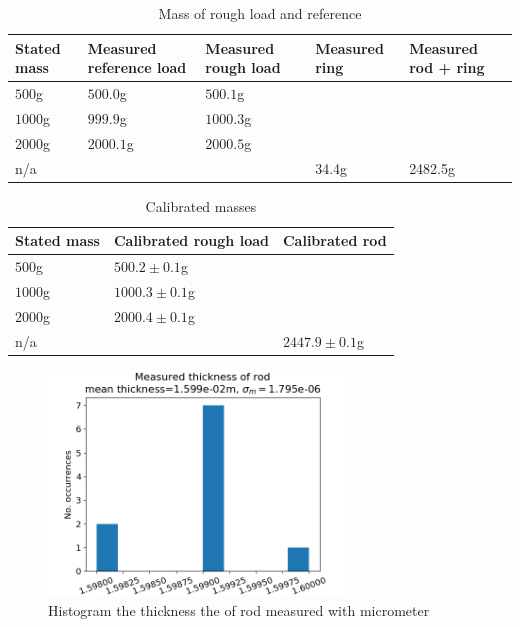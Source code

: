 \documentclass[11pt,a4paper]{article}
\begin{document}
    \begin{table}[H]
      \center
      \caption{Mass of rough load and reference}
      \begin{tabular}{ | l | l | l | l | l |}
        \hline
        Stated mass   & Measured reference load   & Measured rough load & Measured ring & Measured rod + ring \\ \hline
        $500$g        & $500.0$g             & $500.1$g &   &  \\ \hline
        $1000$g       & $999.9$g             & $1000.3$g &  &  \\ \hline
        $2000$g       & $2000.1$g            & $2000.5$g &  &  \\ \hline
        n/a           &  &  & 34.4g & 2482.5g
        \\ \hline
      \end{tabular}
      \label{tab:masses}
    \end{table}

    \begin{table}[H]
      \center
      \caption{Calibrated masses}
      \begin{tabular}{ | l | l | l |}
        \hline
        Stated mass & Calibrated rough load & Calibrated rod \\ \hline
        $500$g  & $500.2\pm 0.1$g  &  \\ \hline
        $1000$g &$1000.3\pm 0.1$g  &  \\ \hline
        $2000$g &$2000.4\pm 0.1$g  &  \\ \hline
        n/a     &            & $2447.9\pm 0.1$g
        \\ \hline
      \end{tabular}
      \label{tab:masses_calibrated}
    \end{table}

    \begin{figure}[H]
      \center
      \includegraphics[width=8cm]{scripts/figs/thickdat.png}  
      \caption{Histogram the thickness the of rod measured with micrometer}
      \label{fig:thick} 
    \end{figure} 
\end{document}
